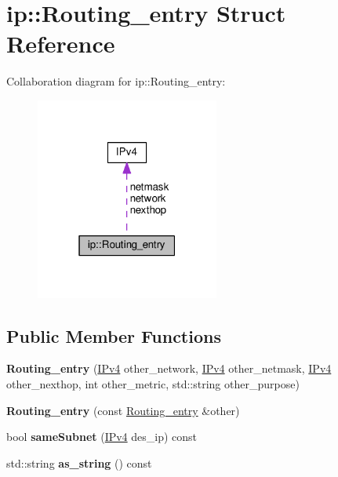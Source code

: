 \hypertarget{structip_1_1Routing__entry}{}\section{ip\+:\+:Routing\+\_\+entry Struct Reference}
\label{structip_1_1Routing__entry}


Collaboration diagram for ip\+:\+:Routing\+\_\+entry\+:\nopagebreak
\begin{figure}[H]
\begin{center}
\leavevmode
\includegraphics[width=171pt]{structip_1_1Routing__entry__coll__graph}
\end{center}
\end{figure}
\subsection*{Public Member Functions}
\begin{DoxyCompactItemize}
\item 
{\bfseries Routing\+\_\+entry} (\hyperlink{structIPv4}{I\+Pv4} other\+\_\+network, \hyperlink{structIPv4}{I\+Pv4} other\+\_\+netmask, \hyperlink{structIPv4}{I\+Pv4} other\+\_\+nexthop, int other\+\_\+metric, std\+::string other\+\_\+purpose)\hypertarget{structip_1_1Routing__entry_aa74e68d82782de83e6adaee3307d71c3}{}\label{structip_1_1Routing__entry_aa74e68d82782de83e6adaee3307d71c3}

\item 
{\bfseries Routing\+\_\+entry} (const \hyperlink{structip_1_1Routing__entry}{Routing\+\_\+entry} \&other)\hypertarget{structip_1_1Routing__entry_af365ea3a7377448bdaf58dd82795bfa1}{}\label{structip_1_1Routing__entry_af365ea3a7377448bdaf58dd82795bfa1}

\item 
bool {\bfseries same\+Subnet} (\hyperlink{structIPv4}{I\+Pv4} des\+\_\+ip) const \hypertarget{structip_1_1Routing__entry_ae756d25da9d7cda6c2fe7aed59284b18}{}\label{structip_1_1Routing__entry_ae756d25da9d7cda6c2fe7aed59284b18}

\item 
std\+::string {\bfseries as\+\_\+string} () const \hypertarget{structip_1_1Routing__entry_ace4715a82faf3918f5cc75d1eb361f00}{}\label{structip_1_1Routing__entry_ace4715a82faf3918f5cc75d1eb361f00}

\end{DoxyCompactItemize}
